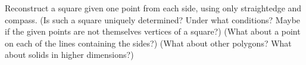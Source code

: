 Reconstruct a square given one point from each side,
using only straightedge and compass.
\newline
(Is such a square uniquely determined? Under what conditions?
Maybe if the given points are not themselves vertices of a square?)
\newline
(What about a point on each of the lines containing the sides?)
\newline
(What about other polygons? What about solids in higher dimensions?)
